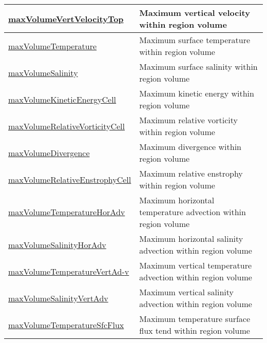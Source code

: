 {\begin{center}
\begin{longtable}{| p{2.0in} | p{4.0in} |}
    \hline
    \hyperref[subsec:var_sec_layerVolumeWeightedAverageAM_maxVolumeVertVelocityTop]{maxVolumeVertVelocityTop} & Maximum vertical velocity within region volume \\
    \hline
    \hyperref[subsec:var_sec_layerVolumeWeightedAverageAM_maxVolumeTemperature]{maxVolumeTemperature} & Maximum surface temperature within region volume \\
    \hline
    \hyperref[subsec:var_sec_layerVolumeWeightedAverageAM_maxVolumeSalinity]{maxVolumeSalinity} & Maximum surface salinity within region volume \\
    \hline
    \hyperref[subsec:var_sec_layerVolumeWeightedAverageAM_maxVolumeKineticEnergyCell]{maxVolumeKineticEnergyCell} & Maximum kinetic energy within region volume \\
    \hline
    \hyperref[subsec:var_sec_layerVolumeWeightedAverageAM_maxVolumeRelativeVorticityCell]{maxVolumeRelativeVorticityCell} & Maximum relative vorticity within region volume \\
    \hline
    \hyperref[subsec:var_sec_layerVolumeWeightedAverageAM_maxVolumeDivergence]{maxVolumeDivergence} & Maximum divergence within region volume \\
    \hline
    \hyperref[subsec:var_sec_layerVolumeWeightedAverageAM_maxVolumeRelativeEnstrophyCell]{maxVolumeRelativeEnstrophyCell} & Maximum relative enstrophy within region volume \\
    \hline
    \hyperref[subsec:var_sec_layerVolumeWeightedAverageAM_maxVolumeTemperatureHorAdv]{maxVolumeTemperatureHorAdv} & Maximum horizontal temperature advection within region volume \\
    \hline
    \hyperref[subsec:var_sec_layerVolumeWeightedAverageAM_maxVolumeSalinityHorAdv]{maxVolumeSalinityHorAdv} & Maximum horizontal salinity advection within region volume \\
    \hline
    \hyperref[subsec:var_sec_layerVolumeWeightedAverageAM_maxVolumeTemperatureVertAdv]{maxVolumeTemperatureVertAd-}\hyperref[subsec:var_sec_layerVolumeWeightedAverageAM_maxVolumeTemperatureVertAdv]{v}  & Maximum vertical temperature advection within region volume \\
    \hline
    \hyperref[subsec:var_sec_layerVolumeWeightedAverageAM_maxVolumeSalinityVertAdv]{maxVolumeSalinityVertAdv} & Maximum vertical salinity advection within region volume \\
    \hline
    \hyperref[subsec:var_sec_layerVolumeWeightedAverageAM_maxVolumeTemperatureSfcFlux]{maxVolumeTemperatureSfcFlux} & Maximum temperature surface flux tend within region volume \\

\end{longtable}
\end{center}}
